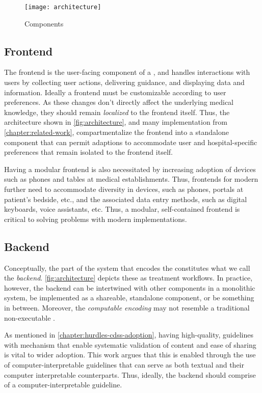 \begin{figure}[t]
\centering
\texttt{[image: architecture]}
\caption{\CDSSs{} Components}\label{fig:architecture}
\end{figure}


\subsection{Frontend}\label{sec:frontend}

The frontend is the user-facing component of a \CDSS{}, and
handles interactions with users by collecting user actions,
delivering guidance, and displaying data and information.
Ideally a \CDSS{} frontend must be customizable according to
user preferences. As these changes don't directly
affect the underlying medical knowledge, they should remain
\emph{localized} to the frontend itself.
Thus, the architecture shown in \autoref{fig:architecture},
and many implementation from \autoref{chapter:related-work},
compartmentalize the frontend into a standalone component that
can permit adaptions to accommodate user and hospital-specific
preferences that remain isolated to the frontend itself.

Having a modular frontend is also necessitated by increasing
adoption of devices such as phones and tables at medical establishments.
Thus, frontends for modern \CDSSs{} further need to accommodate
diversity in devices, such as phones, portals at patient's bedside, etc.,
and the associated data entry methods, such as digital keyboards, voice
assistants, etc. Thus, a modular, self-contained frontend is
critical to solving problems with modern \CDSS{} implementations.

\subsection{Backend}\label{sec:backend}

Conceptually, the part of the system that encodes the \BPG{}
constitutes what we call the \emph{backend}. \autoref{fig:architecture}
depicts these as treatment workflows.
In practice, however, the backend can be intertwined with other components in a
monolithic system, be implemented as a shareable,
standalone component, or be something in between. Moreover,
the \emph{computable encoding} may not resemble a traditional
non-executable \BPG{}.

As mentioned in \autoref{chapter:hurdles-cdss-adoption}, having
high-quality, guidelines with mechanism that enable systematic
validation of content and ease of sharing is vital to wider
adoption. This work argues that this is enabled through
the use of computer-interpretable guidelines that can serve as
both textual \BPGs{} and their computer interpretable counterparts. Thus,
ideally, the backend should comprise of a computer-interpretable guideline.

